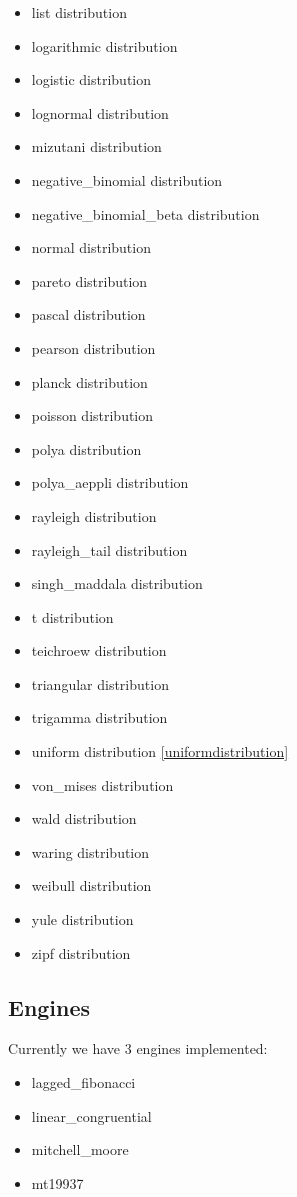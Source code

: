 \begin{itemize}
    \item list distribution
    \item logarithmic distribution
    \item logistic distribution
    \item lognormal distribution
    \item mizutani distribution
    \item negative\_binomial distribution
    \item negative\_binomial\_beta distribution
    \item normal distribution
    \item pareto distribution
    \item pascal distribution
    \item pearson distribution
    \item planck distribution
    \item poisson distribution
    \item polya distribution
    \item polya\_aeppli distribution
    \item rayleigh distribution
    \item rayleigh\_tail distribution
    \item singh\_maddala distribution
    \item t distribution
    \item teichroew distribution
    \item triangular distribution
    \item trigamma distribution
    \item uniform distribution \ref{uniformdistribution}
    \item von\_mises distribution
    \item wald distribution
    \item waring distribution
    \item weibull distribution
    \item yule distribution
    \item zipf distribution
\end{itemize}

\subsection{Engines}
Currently we have 3 engines implemented:
\begin{itemize}
    \item lagged\_fibonacci
    \item linear\_congruential
    \item mitchell\_moore
    \item mt19937
\end{itemize}



